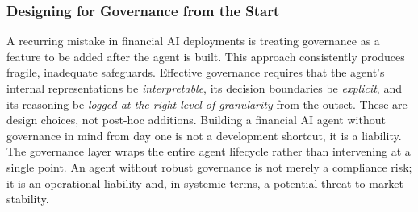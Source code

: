 \documentclass{article}
\begin{document}

\subsubsection{Designing for Governance from the Start}

A recurring mistake in financial AI deployments is treating governance as a feature to be added after the agent is built. This approach consistently produces fragile, inadequate safeguards. Effective governance requires that the agent's internal representations be \textit{interpretable}, its decision boundaries be \textit{explicit}, and its reasoning be \textit{logged at the right level of granularity} from the outset. These are design choices, not post-hoc additions. Building a financial AI agent without governance in mind from day one is not a development shortcut, it is a liability. The governance layer wraps the entire agent lifecycle rather than intervening at a single point. An agent without robust governance is not merely a compliance risk; it is an operational liability and, in systemic terms, a potential threat to market stability. 
\end{document}
